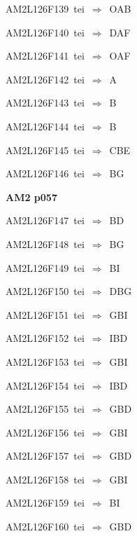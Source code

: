 {\sixrm AM2L126F139\ {\sixit tei}\ }$\Rightarrow$\ OAB\par\smallskip
{\sixrm AM2L126F140\ {\sixit tei}\ }$\Rightarrow$\ DAF\par\smallskip
{\sixrm AM2L126F141\ {\sixit tei}\ }$\Rightarrow$\ OAF\par\smallskip
{\sixrm AM2L126F142\ {\sixit tei}\ }$\Rightarrow$\ A\par\smallskip
{\sixrm AM2L126F143\ {\sixit tei}\ }$\Rightarrow$\ B\par\smallskip
{\sixrm AM2L126F144\ {\sixit tei}\ }$\Rightarrow$\ B\par\smallskip
{\sixrm AM2L126F145\ {\sixit tei}\ }$\Rightarrow$\ CBE\par\smallskip
{\sixrm AM2L126F146\ {\sixit tei}\ }$\Rightarrow$\ BG\par\smallskip

\par\vfill\eject
{\bf\hfill AM2 p057\hfill\hbox{}}\par\bigskip
{\sixrm AM2L126F147\ {\sixit tei}\ }$\Rightarrow$\ BD\par\smallskip
{\sixrm AM2L126F148\ {\sixit tei}\ }$\Rightarrow$\ BG\par\smallskip
{\sixrm AM2L126F149\ {\sixit tei}\ }$\Rightarrow$\ BI\par\smallskip
{\sixrm AM2L126F150\ {\sixit tei}\ }$\Rightarrow$\ DBG\par\smallskip
{\sixrm AM2L126F151\ {\sixit tei}\ }$\Rightarrow$\ GBI\par\smallskip
{\sixrm AM2L126F152\ {\sixit tei}\ }$\Rightarrow$\ IBD\par\smallskip
{\sixrm AM2L126F153\ {\sixit tei}\ }$\Rightarrow$\ GBI\par\smallskip
{\sixrm AM2L126F154\ {\sixit tei}\ }$\Rightarrow$\ IBD\par\smallskip
{\sixrm AM2L126F155\ {\sixit tei}\ }$\Rightarrow$\ GBD\par\smallskip
{\sixrm AM2L126F156\ {\sixit tei}\ }$\Rightarrow$\ GBI\par\smallskip
{\sixrm AM2L126F157\ {\sixit tei}\ }$\Rightarrow$\ GBD\par\smallskip
{\sixrm AM2L126F158\ {\sixit tei}\ }$\Rightarrow$\ GBI\par\smallskip
{\sixrm AM2L126F159\ {\sixit tei}\ }$\Rightarrow$\ BI\par\smallskip
{\sixrm AM2L126F160\ {\sixit tei}\ }$\Rightarrow$\ GBD\par\smallskip

